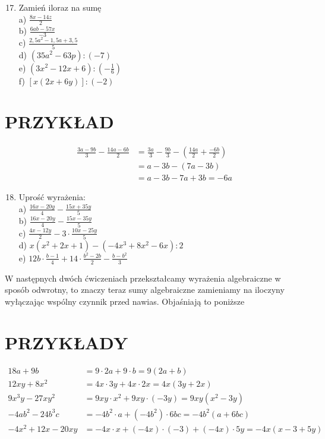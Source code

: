 \documentclass[10pt]{article}
\begin{document}
\begin{enumerate}
  \setcounter{enumi}{16}
  \item Zamień iloraz na sumę\\
a) \(\frac{8 x-14 z}{2}\)\\
b) \(\frac{6 a b-57 x}{-3}\)\\
c) \(\frac{2,5 a^{2}-1,5 a+3,5}{5}\)\\
d) \(\left(35 a^{2}-63 p\right):(-7)\)\\
e) \(\left(3 x^{2}-12 x+6\right):\left(-\frac{1}{6}\right)\)\\
f) \([x(2 x+6 y)]:(-2)\)
\end{enumerate}

\section*{PRZYKŁAD}
\[
\begin{aligned}
\frac{3 a-9 b}{3}-\frac{14 a-6 b}{2} & =\frac{3 a}{3}-\frac{9 b}{3}-\left(\frac{14 a}{2}+\frac{-6 b}{2}\right) \\
& =a-3 b-(7 a-3 b) \\
& =a-3 b-7 a+3 b=-6 a
\end{aligned}
\]

\begin{enumerate}
  \setcounter{enumi}{17}
  \item Uprość wyrażenia:\\
a) \(\frac{16 x-20 y}{4}-\frac{15 x+35 y}{5}\)\\
b) \(\frac{16 x-20 y}{4}-\frac{15 x-35 y}{5}\)\\
c) \(\frac{4 x-12 y}{2}-3 \cdot \frac{10 x-25 y}{5}\)\\
d) \(x\left(x^{2}+2 x+1\right)-\left(-4 x^{3}+8 x^{2}-6 x\right): 2\)\\
e) \(12 b \cdot \frac{b-1}{4}+14 \cdot \frac{b^{2}-2 b}{2}-\frac{b-b^{2}}{3}\)
\end{enumerate}

W następnych dwóch ćwiczeniach przekształcamy wyrażenia algebraiczne w sposób odwrotny, to znaczy teraz sumy algebraiczne zamieniamy na iloczyny wyłączając wspólny czynnik przed nawias. Objaśniają to poniższe

\section*{PRZYKŁADY}
\[
\begin{aligned}
18 a+9 b & =9 \cdot 2 a+9 \cdot b=9(2 a+b) \\
12 x y+8 x^{2} & =4 x \cdot 3 y+4 x \cdot 2 x=4 x(3 y+2 x) \\
9 x^{3} y-27 x y^{2} & =9 x y \cdot x^{2}+9 x y \cdot(-3 y)=9 x y\left(x^{2}-3 y\right) \\
-4 a b^{2}-24 b^{3} c & =-4 b^{2} \cdot a+\left(-4 b^{2}\right) \cdot 6 b c=-4 b^{2}(a+6 b c) \\
-4 x^{2}+12 x-20 x y & =-4 x \cdot x+(-4 x) \cdot(-3)+(-4 x) \cdot 5 y=-4 x(x-3+5 y)
\end{aligned}
\]
\end{document}
